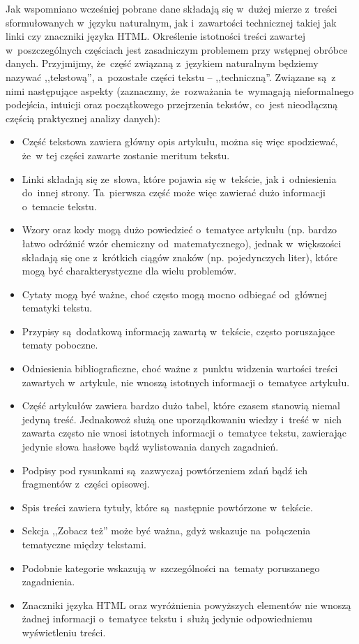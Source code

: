 \documentclass{praca1}
\begin{document}
Jak wspomniano wcześniej pobrane dane składają się w~dużej mierze z~treści sformułowanych w~języku naturalnym, jak i~zawartości technicznej takiej jak linki czy znaczniki języka HTML. Określenie istotności treści zawartej w~poszczególnych częściach jest zasadniczym problemem przy wstępnej obróbce danych. Przyjmijmy, że~część związaną z~językiem naturalnym będziemy nazywać ,,tekstową'', a~pozostałe części tekstu -- ,,techniczną''. Związane są~z nimi następujące aspekty (zaznaczmy, że~rozważania te~wymagają nieformalnego podejścia, intuicji oraz początkowego przejrzenia tekstów, co~jest nieodłączną częścią praktycznej analizy danych):
\begin{itemize}
\item Część tekstowa zawiera główny opis artykułu, można się więc spodziewać, że~w tej części zawarte zostanie meritum tekstu.
\item Linki składają się ze~słowa, które pojawia się w~tekście, jak i~odniesienia do~innej strony. Ta~pierwsza część może więc zawierać dużo informacji o~temacie tekstu.
\item Wzory oraz kody mogą dużo powiedzieć o~tematyce artykułu (np. bardzo łatwo odróżnić wzór chemiczny od~matematycznego), jednak w~większości składają się one z~krótkich ciągów znaków (np. pojedynczych liter), które mogą być charakterystyczne dla wielu problemów.
\item Cytaty mogą być ważne, choć często mogą mocno odbiegać od~głównej tematyki tekstu.
\item Przypisy są~dodatkową informacją zawartą w~tekście, często poruszające tematy poboczne.
\item Odniesienia bibliograficzne, choć ważne z~punktu widzenia wartości treści zawartych w~artykule, nie wnoszą istotnych informacji o~tematyce artykułu.
\item Część artykułów zawiera bardzo dużo tabel, które czasem stanowią niemal jedyną treść. Jednakowoż służą one uporządkowaniu wiedzy i~treść w~nich zawarta często nie wnosi istotnych informacji o~tematyce tekstu, zawierając jedynie słowa hasłowe bądź wylistowania danych zagadnień.
\item Podpisy pod rysunkami są~zazwyczaj powtórzeniem zdań bądź ich fragmentów z~części opisowej.
\item Spis treści zawiera tytuły, które są~następnie powtórzone w~tekście.
\item Sekcja ,,Zobacz też'' może być ważna, gdyż wskazuje na~połączenia tematyczne między tekstami.
\item Podobnie kategorie wskazują w~szczególności na~tematy poruszanego zagadnienia.
\item Znaczniki języka HTML oraz wyróżnienia powyższych elementów nie wnoszą żadnej informacji o~tematyce tekstu i~służą jedynie odpowiedniemu wyświetleniu treści.
\end{itemize}
\end{document}
